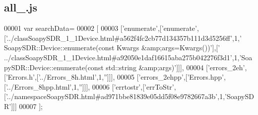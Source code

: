 \subsection{all\+\_.\+js}
\label{all__4_8js_source}

\begin{DoxyCode}
00001 var searchData=
00002 [
00003   [\textcolor{stringliteral}{'enumerate'},[\textcolor{stringliteral}{'enumerate'},[\textcolor{stringliteral}{'../classSoapySDR\_1\_1Device.html#a562f4fc2cb77d134357b111d3d5256ff'},1,\textcolor{stringliteral}{'
      SoapySDR::Device::enumerate(const Kwargs &amp;args=Kwargs())'}],[\textcolor{stringliteral}{'
      ../classSoapySDR\_1\_1Device.html#a92050e1daf16615aba275b042276f3d1'},1,\textcolor{stringliteral}{'SoapySDR::Device::enumerate(const std::string &amp;args)'}]]],
00004   [\textcolor{stringliteral}{'errors\_2eh'},[\textcolor{stringliteral}{'Errors.h'},[\textcolor{stringliteral}{'../Errors\_8h.html'},1,\textcolor{stringliteral}{''}]]],
00005   [\textcolor{stringliteral}{'errors\_2ehpp'},[\textcolor{stringliteral}{'Errors.hpp'},[\textcolor{stringliteral}{'../Errors\_8hpp.html'},1,\textcolor{stringliteral}{''}]]],
00006   [\textcolor{stringliteral}{'errtostr'},[\textcolor{stringliteral}{'errToStr'},[\textcolor{stringliteral}{'../namespaceSoapySDR.html#ad971bbe81839e05dd5f08e9782667a3b'},1,\textcolor{stringliteral}{'SoapySDR'}]]]
00007 ];
\end{DoxyCode}
